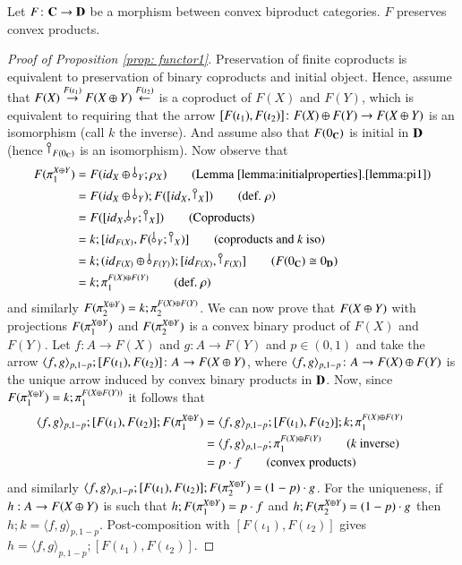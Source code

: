 \begin{proposition}\label{prop: functor1}
    Let $F\colon \mathbf{C}\to \mathbf{D}$ be a morphism between convex biproduct categories. 
     $F$ preserves convex products.
   \end{proposition}
   \begin{proof}[Proof of Proposition \ref{prop: functor1}]
    Preservation of finite coproducts is equivalent to preservation of binary coproducts and initial object. Hence, assume that $F(X)\overset{F(\iota_1)}{\to}F(X\oplus Y)\overset{F(\iota_2)}{\leftarrow}$ is a coproduct of $F(X)$ and $F(Y)$, which is equivalent to requiring that the arrow $[F(\iota_1),F(\iota_2)]\colon F(X)\oplus F(Y)\to F(X\oplus Y)$ is an isomorphism (call $k$ the inverse). And assume also that $F(0_{\mathbf{C}})$ is initial in $\mathbf{D}$ (hence $\cobang{F(\zero_{\Cat{C}})}$ is an isomorphism). Now observe that
    \begin{align}
        F(\pi_1^{X\piu Y})&= F(\id{X}\piu\, \bangp{Y};\rho_X) \tag{Lemma \ref{lemma:initialproperties}.\ref{lemma:pi1}}\\
        &=F(\id{X}\piu\, \bangp{Y});F([\id{X}, \cobang{X}]) \tag{def. $\rho$}\\
        &= F([\id{X}, \bangp{Y};\cobang{X}]) \tag{Coproducts}\\
        &=k;[\id{F(X)}, F(\,\bangp{Y};\cobang{X})] \tag{coproducts and $k$ iso}\\
        &= k;(\id{F(X)}\oplus\, \bangp{F(Y)});[\id{F(X)},\cobang{F(X)}] \tag{$F(\zero_\Cat{C})\cong\zero_\Cat{D}$}\\
        &= k;\pi_1^{F(X)\piu F(Y)} \tag{def.\ $\rho$}
    \end{align}
    and similarly $F(\pi_2^{X\oplus Y})=k;\pi_2^{F(X)\oplus F(Y)}$. We can now prove that $F(X\oplus Y)$ with projections $F(\pi_1^{X\oplus Y})$ and $F(\pi_2^{X\oplus Y})$ is a convex binary product of $F(X)$ and $F(Y)$. Let $f\colon A\to F(X)$ and $g\colon A\to F(Y)$ and $p\in (0,1)$ and take the arrow $\langle f,g \rangle_{p,1-p};[F(\iota_1), F(\iota_2)]\colon A \to F(X \oplus Y)$, where $\langle f,g \rangle_{p,1-p}\colon A \to F(X)\oplus F(Y)$ is the unique arrow induced by convex binary products in $\mathbf{D}$. Now, since $F(\pi_1^{X\oplus Y})= k; \pi_1^{F(X\oplus F(Y))}$ it follows that 
    \begin{align}
        \langle f,g \rangle_{p,1-p};[F(\iota_1), F(\iota_2)];F(\pi_1^{X\oplus Y})&= \langle f,g \rangle_{p,1-p};[F(\iota_1), F(\iota_2)];k;\pi_1^{F(X)\oplus F(Y)}  \tag*{}\\
        &= \langle f,g \rangle_{p,1-p};\pi_1^{F(X)\oplus F(Y)} \tag{$k$ inverse}\\
        &=p\cdot f \tag{convex products}
    \end{align}
    and similarly $\langle f,g \rangle_{p,1-p};[F(\iota_1), F(\iota_2)];F(\pi_2^{X\oplus Y})=(1-p)\cdot g$. For the uniqueness, if $h:A \to F(X\oplus Y)$ is such that $h;F(\pi_1^{X\oplus Y})=p\cdot f$ and $h;F(\pi_2^{X\oplus Y})=(1-p)\cdot g$ then $h;k= \langle f,g \rangle_{p,1-p}$. Post-composition with $[F(\iota_1),F(\iota_2)]$ gives $h= \langle f,g \rangle_{p,1-p};[F(\iota_1), F(\iota_2)]$.
   \end{proof}
   
